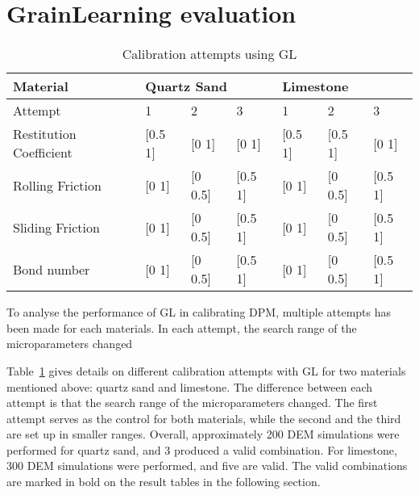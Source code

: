 \section{GrainLearning evaluation}\label{section:GLPerformance} 
\begin{table}[H]
    \centering
    \begin{tabular}{l|lll|lll}
    Material                & \multicolumn{3}{l|}{Quartz Sand}       & \multicolumn{3}{l}{Limestone}          \\ \hline
    Attempt                 & 1          & 2           & 3           & 1          & 2           & 3           \\ \hline
    Restitution Coefficient & {[}0.5  1{]} & {[}0  1{]}  & {[}0 1{]}   & {[}0.5  1{]} & {[}0.5  1{]}  & {[}0 1{]}   \\
    Rolling Friction        & {[}0 1{]}  & {[}0 0.5{]} & {[}0.5 1{]} & {[}0 1{]}  & {[}0 0.5{]} & {[}0.5 1{]} \\
    Sliding Friction        & {[}0 1{]}  & {[}0 0.5{]} & {[}0.5 1{]} & {[}0 1{]}  & {[}0 0.5{]} & {[}0.5 1{]} \\
    Bond number             & {[}0 1{]}  & {[}0 0.5{]} & {[}0.5 1{]} & {[}0 1{]}  & {[}0 0.5{]} & {[}0.5 1{]} \\
    \end{tabular}
    \caption{Calibration attempts using GL}\label{table:GLCalibration}
\end{table}


To analyse the performance of GL in calibrating DPM, multiple attempts has been made for each materials. In each attempt, the search range of the microparameters changed

Table~\ref{table:GLCalibration} gives details on different calibration attempts with GL for two materials mentioned above: quartz sand and limestone. The difference between each attempt is that the search range of the microparameters changed. The first attempt serves as the control for both materials, while the second and the third are set up in smaller ranges. Overall, approximately 200 DEM simulations were performed for quartz sand, and 3 produced a valid combination. For limestone, 300 DEM simulations were performed, and five are valid. The valid combinations are marked in bold on the result tables in the following section.

